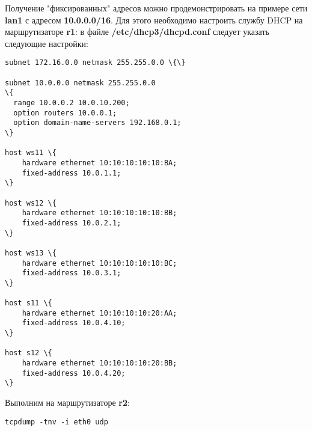 \documentclass[a4paper,12pt]{article}
\begin{document}
Получение "фиксированных" адресов можно продемонстрировать на
примере сети \textbf{lan1} с адресом \textbf{10.0.0.0/16}. Для
этого необходимо настроить службу DHCP на маршрутизаторе
\textbf{r1}: в файле \textbf{/etc/dhcp3/dhcpd.conf} следует
указать следующие настройки:
\begin{Verbatim}
subnet 172.16.0.0 netmask 255.255.0.0 \{\}

subnet 10.0.0.0 netmask 255.255.0.0
\{
  range 10.0.0.2 10.0.10.200;
  option routers 10.0.0.1;
  option domain-name-servers 192.168.0.1;
\}

host ws11 \{
    hardware ethernet 10:10:10:10:10:BA;
    fixed-address 10.0.1.1;
\}

host ws12 \{
    hardware ethernet 10:10:10:10:10:BB;
    fixed-address 10.0.2.1;
\}

host ws13 \{
    hardware ethernet 10:10:10:10:10:BC;
    fixed-address 10.0.3.1;
\}

host s11 \{
    hardware ethernet 10:10:10:10:20:AA;
    fixed-address 10.0.4.10;
\}

host s12 \{
    hardware ethernet 10:10:10:10:20:BB;
    fixed-address 10.0.4.20;
\}
\end{Verbatim}

Выполним на маршрутизаторе \textbf{r2}:
\begin{Verbatim}
tcpdump -tnv -i eth0 udp
\end{Verbatim}
\end{document}
